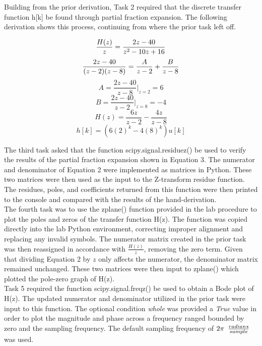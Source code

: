 \documentclass[12pt]{report}
\newcommand{\adjust}{\hspace{0.5em}}
\begin{document}
Building from the prior derivation, Task 2 required that the discrete transfer function h[k] be found through partial fraction expansion. The following derivation shows this process, continuing from where the prior task left off.

\begin{equation*}
	\frac{H(z)}{z} = \frac{2z - 40}{z^2 - 10z + 16} \\
\end{equation*}
\begin{equation*}
	\frac{2z - 40}{(z - 2)(z - 8)} = \frac{A}{z - 2} + \frac{B}{z - 8} \\
\end{equation*}
\begin{equation*}
	A = \frac{2z - 40}{z - 8}|_{z = 2} = 6
\end{equation*}
\begin{equation*}
	B = \frac{2z - 40}{z - 2}|_{z = 8} = -4
\end{equation*}
\begin{equation}
	H(z) = \frac{6z}{z - 2} - \frac{4z}{z - 8}
\end{equation}
\begin{equation}
	h[k] = (6(2)^k - 4(8)^k)u[k]
\end{equation}

The third task asked that the function scipy.signal.residuez() be used to verify the results of the partial fraction expansion shown in Equation 3. The numerator and denominator of Equation 2 were implemented as matrices in Python. These two matrices were then used as the input to the Z-transform residue function. The residues, poles, and coefficients returned from this function were then printed to the console and compared with the results of the hand-derivation. \\ 

The fourth task was to use the zplane() function provided in the lab procedure to plot the poles and zeros of the transfer function H(z). The function was copied directly into the lab Python environment, correcting improper alignment and replacing any invalid symbols. The numerator matrix created in the prior task was then reassigned in accordance with $ \frac{H(z)}{z} $, removing the zero term. Given that dividing Equation 2 by $ z $ only affects the numerator, the denominator matrix remained unchanged. These two matrices were then input to zplane() which plotted the pole-zero graph of H(z). \\

Task 5 required the function scipy.signal.freqz() be used to obtain a Bode plot of H(z). The updated numerator and denominator utilized in the prior task were input to this function. The optional condition \textit{whole} was provided a \textit{True} value in order to plot the magnitude and phase across a frequency ranged bounded by zero and the sampling frequency. The default sampling frequency of $ 2\pi\adjust\frac{radians}{sample} $ was used. \\
\end{document}
